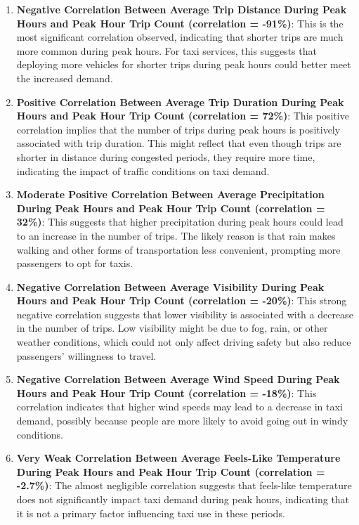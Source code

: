 \documentclass[11pt]{article}
\begin{document}
\begin{enumerate}
    \item \textbf{Negative Correlation Between Average Trip Distance During Peak Hours and Peak Hour Trip Count (correlation = -91\%)}: This is the most significant correlation observed, indicating that shorter trips are much more common during peak hours. For taxi services, this suggests that deploying more vehicles for shorter trips during peak hours could better meet the increased demand.

    \item \textbf{Positive Correlation Between Average Trip Duration During Peak Hours and Peak Hour Trip Count (correlation = 72\%)}: This positive correlation implies that the number of trips during peak hours is positively associated with trip duration. This might reflect that even though trips are shorter in distance during congested periods, they require more time, indicating the impact of traffic conditions on taxi demand.

    \item \textbf{Moderate Positive Correlation Between Average Precipitation During Peak Hours and Peak Hour Trip Count (correlation = 32\%)}: This suggests that higher precipitation during peak hours could lead to an increase in the number of trips. The likely reason is that rain makes walking and other forms of transportation less convenient, prompting more passengers to opt for taxis.

    \item \textbf{Negative Correlation Between Average Visibility During Peak Hours and Peak Hour Trip Count (correlation = -20\%)}: This strong negative correlation suggests that lower visibility is associated with a decrease in the number of trips. Low visibility might be due to fog, rain, or other weather conditions, which could not only affect driving safety but also reduce passengers' willingness to travel.

    \item \textbf{Negative Correlation Between Average Wind Speed During Peak Hours and Peak Hour Trip Count (correlation = -18\%)}: This correlation indicates that higher wind speeds may lead to a decrease in taxi demand, possibly because people are more likely to avoid going out in windy conditions.

    \item \textbf{Very Weak Correlation Between Average Feels-Like Temperature During Peak Hours and Peak Hour Trip Count (correlation = -2.7\%)}: The almost negligible correlation suggests that feels-like temperature does not significantly impact taxi demand during peak hours, indicating that it is not a primary factor influencing taxi use in these periods.
\end{enumerate}
\end{document}

